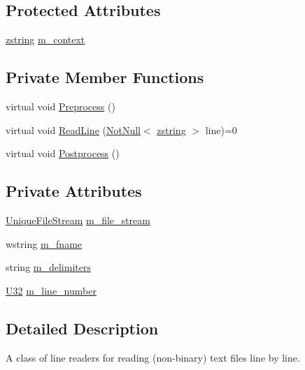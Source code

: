 \subsection*{Protected Attributes}
\begin{DoxyCompactItemize}
\item 
\hyperlink{namespacemage_a4163ec9a9a27d5e7f4b452dcb99cb2b9}{zstring} \hyperlink{classmage_1_1_line_reader_ae1f715152d14188cc490870e307099d8}{m\+\_\+context}
\end{DoxyCompactItemize}
\subsection*{Private Member Functions}
\begin{DoxyCompactItemize}
\item 
virtual void \hyperlink{classmage_1_1_line_reader_a4de135cfb0434be786cfcfd7959031ef}{Preprocess} ()
\item 
virtual void \hyperlink{classmage_1_1_line_reader_ae50ac0637eddead37a7a9cca2a570072}{Read\+Line} (\hyperlink{namespacemage_a8769f9d670d6b585ea306cb1062af94b}{Not\+Null}$<$ \hyperlink{namespacemage_a4163ec9a9a27d5e7f4b452dcb99cb2b9}{zstring} $>$ line)=0
\item 
virtual void \hyperlink{classmage_1_1_line_reader_adfde21013140a1058d3dd567204abfb5}{Postprocess} ()
\end{DoxyCompactItemize}
\subsection*{Private Attributes}
\begin{DoxyCompactItemize}
\item 
\hyperlink{namespacemage_a0ee1bd45ad7dbb3dc8c8e1770e3538d4}{Unique\+File\+Stream} \hyperlink{classmage_1_1_line_reader_a510ff5355c6d26d7c29dc692ef18a3e2}{m\+\_\+file\+\_\+stream}
\item 
wstring \hyperlink{classmage_1_1_line_reader_ad6f55ba12fc610ab2fc1c26a48d12321}{m\+\_\+fname}
\item 
string \hyperlink{classmage_1_1_line_reader_a6de3398ac59fdd98f8c40cff6f5c1075}{m\+\_\+delimiters}
\item 
\hyperlink{namespacemage_a41c104c036fba3756a74e19f793eeaa1}{U32} \hyperlink{classmage_1_1_line_reader_ab145590a7e115106c0987905fde98393}{m\+\_\+line\+\_\+number}
\end{DoxyCompactItemize}


\subsection{Detailed Description}
A class of line readers for reading (non-\/binary) text files line by line. 

